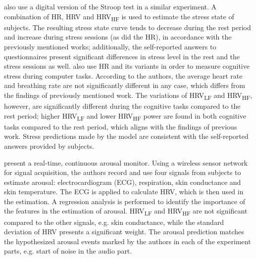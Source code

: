 \textcite{bousefsaf2013remote} also use a digital version of the Stroop test in a similar experiment. A combination of HR, HRV and HRV\textsubscript{HF} is used to estimate the stress state of subjects. The resulting stress state curve tends to decrease during the rest period and increase during stress sessions (as did the HR), in accordance with the previously mentioned works; additionally, the self-reported answers to questionnaires present significant differences in stress level in the rest and the stress sessions as well. \textcite{mcduff2014remote,mcduffcogcam} also use HR and its variants in order to measure cognitive stress during computer tasks. According to the authors, the average heart rate and breathing rate are not significantly different in any case, which differs from the findings of previously mentioned work. The variations of HRV\textsubscript{LF} and HRV\textsubscript{HF}, however, are significantly different during the cognitive tasks compared to the rest period; higher HRV\textsubscript{LF} and lower HRV\textsubscript{HF} power are found in both cognitive tasks compared to the rest period, which aligns with the findings of previous work. Stress predictions made by the model are consistent with the self-reported answers provided by subjects.

\textcite{grundlehner2009design} present a real-time, continuous arousal monitor. Using a wireless sensor network for signal acquisition, the authors record and use four signals from subjects to estimate arousal: electrocardiogram (ECG), respiration, skin conductance and skin temperature. The ECG is applied to calculate HRV, which is then used in the estimation. A regression analysis is performed to identify the importance of the features in the estimation of arousal. HRV\textsubscript{LF} and HRV\textsubscript{HF} are not significant compared to the other signals, e.g. skin conductance, while the standard deviation of HRV presents a significant weight. The arousal prediction matches the hypothesized arousal events marked by the authors in each of the experiment parts, e.g. start of noise in the audio part.

